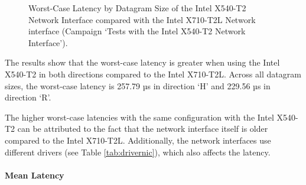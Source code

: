 \begin{figure}[h!]
  \centering
  \vspace{10pt}
  \caption{Worst-Case Latency by Datagram Size of the Intel X540-T2 Network Interface compared with the Intel X710-T2L Network interface (Campaign `Tests with the Intel X540-T2 Network Interface').}
  \label{fig:540Wc}
\end{figure}

The results show that the worst-case latency is greater when using the Intel X540-T2 in both directions compared to the Intel X710-T2L. Across all datagram sizes, the worst-case latency is 257.79 µs in direction `H' and 229.56 µs in direction `R'.

The higher worst-case latencies with the same configuration with the Intel X540-T2 can be attributed to the fact that the network interface itself is older compared to the Intel X710-T2L. Additionally, the network interfaces use different drivers (see Table \ref{tab:drivernic}), which also affects the latency.

\paragraph{Mean Latency}

